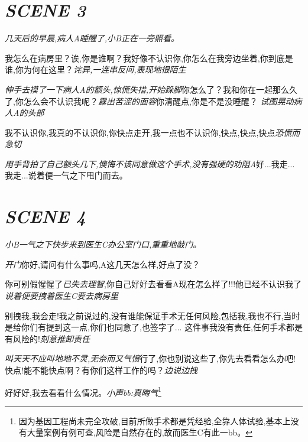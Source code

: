 \documentclass[11pt,a4paper,oneside]{memoir}  %
\begin{document}
\section*{\hfill\textit{SCENE 3}}
\begin{description}[itemsep=1ex,leftmargin=1cm]
    \setlength{\parskip}{5pt}
    \item[] \hfill

    \textit{几天后的早晨,病人\textup{A}睡醒了,小\textup{B}正在一旁照看。}
    \item[病人A] 我怎么在病房里？诶,你是谁啊？我好像不认识你,你怎么在我旁边坐着,你到底是谁,你为何在这里？\textit{诧异,一连串反问,表现地很陌生}
    \item[小B] \textit{伸手去摸了一下病人\textup{A}的额头,惊慌失措,开始跺脚}你怎么了？我和你在一起那么久了,你怎么会不认识我呢？\textit{露出苦涩的面容}你清醒点,你是不是没睡醒？
    \textit{试图晃动病人\textup{A}的头部}
    \item[病人A] 我不认识你,我真的不认识你,你快点走开,我一点也不认识你,快点,快点,快点\textit{恐慌而急切}
    \item[小B] \textit{用手背拍了自己额头几下,懊悔不该同意做这个手术,没有强硬的劝阻\textup{A}}好...我走...我走...说着便一气之下甩门而去。    
\end{description}
\vskip 1cm

\section*{\hfill\textit{SCENE 4}}
\begin{description}[itemsep=1ex,leftmargin=1cm]
    \setlength{\parskip}{5pt}
    \item[] \hfill

    \textit{小\textup{B}一气之下快步来到医生\textup{C}办公室门口,重重地敲门。}
    \item[医生C] \textit{开门}你好,请问有什么事吗,A这几天怎么样,好点了没？
    \item[小B] 你可别假惺惺了\textit{已失去理智},你自己好好去看看A现在怎么样了!!!他已经不认识我了\textit{说着便要拽着医生\textup{C}要去病房里}
    \item[医生C] 别拽我,我会走!我之前说过的,没有谁能保证手术无任何风险,包括我,我也不行,当时是给你们有提到这一点,你们也同意了,也签字了...
    这件事我没有责任,任何手术都是有风险的!\textit{刻意推卸责任}
    \item[小B] \textit{叫天天不应叫地地不灵,无奈而又气愤}行了,你也别说这些了,你先去看看怎么办吧!快点!能不能快点啊？有你们这样工作的吗？\textit{边说边拽}
    \item[医生C] 好好好,我去看看什么情况。\textit{小声bb:真晦气}\footnote{因为基因工程尚未完全攻破,目前所做手术都是凭经验,全靠人体试验,基本上没有大量案例有例可查,风险是自然存在的,故而医生C有此一bb。}
\end{description}
\vskip 1cm
\end{document}
